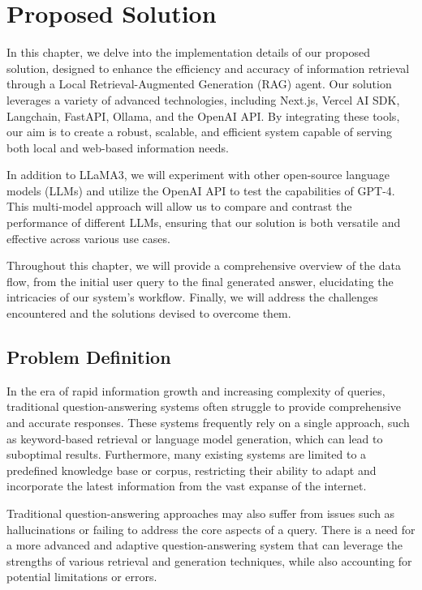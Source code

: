 \chapter{Proposed Solution}

In this chapter, we delve into the implementation details of our proposed solution, designed to enhance the efficiency and accuracy of information retrieval through a Local Retrieval-Augmented Generation (RAG) agent. Our solution leverages a variety of advanced technologies, including Next.js, Vercel AI SDK, Langchain, FastAPI, Ollama, and the OpenAI API. By integrating these tools, our aim is to create a robust, scalable, and efficient system capable of serving both local and web-based information needs.

In addition to LLaMA3, we will experiment with other open-source language models (LLMs) and utilize the OpenAI API to test the capabilities of GPT-4. This multi-model approach will allow us to compare and contrast the performance of different LLMs, ensuring that our solution is both versatile and effective across various use cases.

Throughout this chapter, we will provide a comprehensive overview of the data flow, from the initial user query to the final generated answer, elucidating the intricacies of our system's workflow. Finally, we will address the challenges encountered and the solutions devised to overcome them.

\section{Problem Definition}

In the era of rapid information growth and increasing complexity of queries, traditional question-answering systems often struggle to provide comprehensive and accurate responses. These systems frequently rely on a single approach, such as keyword-based retrieval or language model generation, which can lead to suboptimal results. Furthermore, many existing systems are limited to a predefined knowledge base or corpus, restricting their ability to adapt and incorporate the latest information from the vast expanse of the internet.

Traditional question-answering approaches may also suffer from issues such as hallucinations \cite{zhang2023sirens} or failing to address the core aspects of a query. There is a need for a more advanced and adaptive question-answering system that can leverage the strengths of various retrieval and generation techniques, while also accounting for potential limitations or errors.

